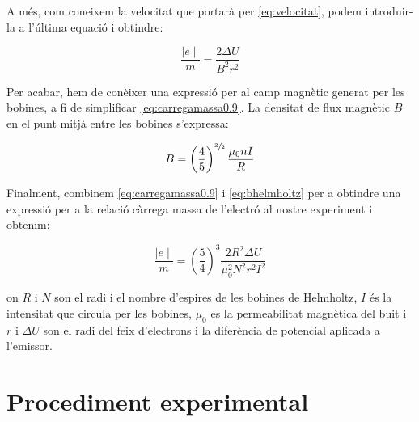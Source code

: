 \documentclass[11pt]{article}
\begin{document}
    A més, com coneixem la velocitat que portarà per \ref{eq:velocitat}, podem introduir-la a l'última equació i obtindre:

    \begin{equation}
        \frac{\mid e\mid}{m}=\frac{2\Delta U}{B^2r^2}
        \label{eq:carregamassa0.9}
    \end{equation}

    \vspace{0.4cm}Per acabar, hem de conèixer una expressió per al camp magnètic generat per les bobines, a fi de simplificar \ref{eq:carregamassa0.9}. La densitat de flux magnètic $B$ en el punt mitjà entre les bobines s'expressa:

    \begin{equation}
        B = \left(\frac45\right)^{\sfrac{3}{2}}\frac{\mu_0nI}{R}
        \label{eq:bhelmholtz}
    \end{equation}

    \vspace{0.4cm}Finalment, combinem \ref{eq:carregamassa0.9} i \ref{eq:bhelmholtz} per a obtindre una expressió per a la relació càrrega massa de l'electró al nostre experiment i obtenim:

    \begin{equation}
        \boxed{
            \frac{\mid e\mid}{m}=\left(\frac{5}{4}\right)^3\frac{2R^2\Delta U}{\mu_0^2 N^2 r^2 I^2}
        }
        \label{eq:carregamassa}
    \end{equation}

    \vspace{0.2cm}on $R$ i $N$ son el radi i el nombre d'espires de les bobines de Helmholtz, $I$ és la intensitat que circula per les bobines, $\mu_0$ es la permeabilitat magnètica del buit i $r$ i $\Delta U$ son el radi del feix d'electrons i la diferència de potencial aplicada a l'emissor.
    
\clearpage
\section{Procediment experimental}
\end{document}
